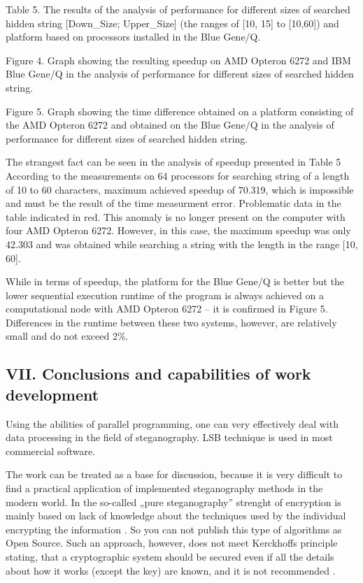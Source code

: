 \documentclass[10pt, a5paper]{article}
\begin{document}
Table 5. The results of the analysis of performance for different sizes of searched hidden string [Down\_Size; Upper\_Size] (the ranges of [10, 15] to [10,60]) and platform based on processors installed in the Blue Gene/Q.


Figure 4. Graph showing the resulting speedup on AMD Opteron 6272 and IBM Blue Gene/Q in the analysis of performance for different sizes of searched hidden string.


Figure 5. Graph showing the time difference obtained on a platform consisting of the AMD Opteron 6272 and obtained on the Blue Gene/Q in the analysis of performance for different sizes of searched hidden string.

The strangest fact can be seen in the analysis of speedup presented in Table 5 According to the measurements on 64 processors for searching string of a length of 10 to 60 characters, maximum achieved speedup of 70.319, which is impossible and must be the result of the time measurment error. Problematic data in the table indicated in red. This anomaly is no longer present on the computer with four AMD Opteron 6272. However, in this case, the maximum speedup was only 42.303 and was obtained while searching a string with the length in the range [10, 60].

While in terms of speedup, the platform for the Blue Gene/Q is better but the lower sequential execution runtime of the program is always achieved on a computational node with AMD Opteron 6272 -- it is confirmed in Figure 5. Differences in the runtime between these two systems, however, are relatively small and do not exceed 2\%.

\subsection*{VII. Conclusions and capabilities of work development}

Using the abilities of parallel programming, one  can very effectively deal with data processing in the field of steganography. LSB technique is used in most commercial software.

The work can be treated as a base for discussion, because it is very difficult to find a practical application of implemented steganography methods in the modern world. In the so-called „pure steganography” strenght of encryption is mainly based on lack of knowledge about the techniques used by the individual encrypting the information \footnotemark[7]. So you can not publish this type of algorithms as Open Source. Such an approach, however, does not meet Kerckhoffs principle \footnotemark[10] stating, that a cryptographic system should be secured even if all the details about how it works (except the key) are known, and it is not recommended .
\end{document}
